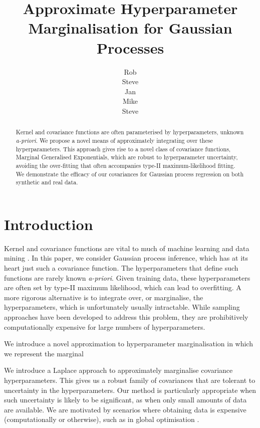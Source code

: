 \documentclass{article}
\title{Approximate Hyperparameter Marginalisation for Gaussian Processes}
\author{
Rob\\
\And
Steve\\
\And
Jan\\
\And
Mike\\
\And
Steve\\}
\begin{document}
\maketitle

\begin{abstract}
Kernel and covariance functions are often parameterised by hyperparameters, unknown {\it a-priori}. We propose a novel means of approximately integrating over these hyperparameters. This approach gives rise to a novel class of covariance functions, Marginal Generalised Exponentials, which are robust to hyperparameter uncertainty, avoiding the over-fitting that often accompanies type-II maximum-likelihood fitting. We demonstrate the efficacy of our covariances for Gaussian process regression on both synthetic and real data.
\end{abstract}


\section{Introduction}

Kernel and covariance functions are vital to much of machine learning and data mining \citep{shawe2004kernel}. In this paper, we consider Gaussian process \citep{rassandwill} inference, which has at its heart just such a covariance function. The hyperparameters that define such functions are rarely known {\it a-priori}. Given training data, these hyperparameters are often set by type-II maximum likelihood, which can lead to overfitting. A more rigorous alternative is to integrate over, or marginalise, the hyperparameters, which is unfortunately usually intractable. While sampling approaches \citep{neal1997monte} have been developed to address this problem, they are prohibitively computationally expensive for large numbers of hyperparameters. 

We introduce a novel approximation to hyperparameter marginalisation in which we represent the
marginal 

We introduce a Laplace approach to approximately marginalise covariance hyperparameters. This gives us a robust family of covariances that are tolerant to uncertainty in the hyperparameters. Our method is particularly appropriate when such uncertainty is likely to be significant, as when only small amounts of data are available. We are motivated by scenarios where obtaining data is expensive (computationally or otherwise), such as in global optimisation \citep{osborne2009gaussian,reece11}. 
\end{document}
